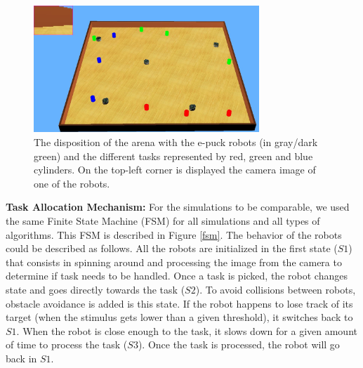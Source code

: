 \begin{figure}[thpb]
	\begin{center}
		\includegraphics[width=8.5cm]{Pictures/Capture.png}
		\caption{The disposition of the arena with the e-puck robots (in gray/dark green) and the different tasks represented by red, green and blue cylinders. On the top-left corner is displayed the camera image of one of the robots.}
    \label{screenshot}
	\end{center}

\end{figure}

\textbf{Task Allocation Mechanism:}
For the simulations to be comparable, we used the same Finite State Machine (FSM) for all simulations and all types of algorithms. This FSM is described in Figure \ref{fsm}. The behavior of the robots could be described as follows. All the robots are initialized in the first state ($S1$) that consists in spinning around and processing the image from the camera to determine if task needs to be handled. Once a task is picked, the robot changes state and goes directly towards the task ($S2$). To avoid collisions between robots, obstacle avoidance is added is this state. If the robot happens to lose track of its target (when the stimulus gets lower than a given threshold), it switches back to $S1$. When the robot is close enough to the task, it slows down for a given amount of time to process the task ($S3$). Once the task is processed, the robot will go back in $S1$.

